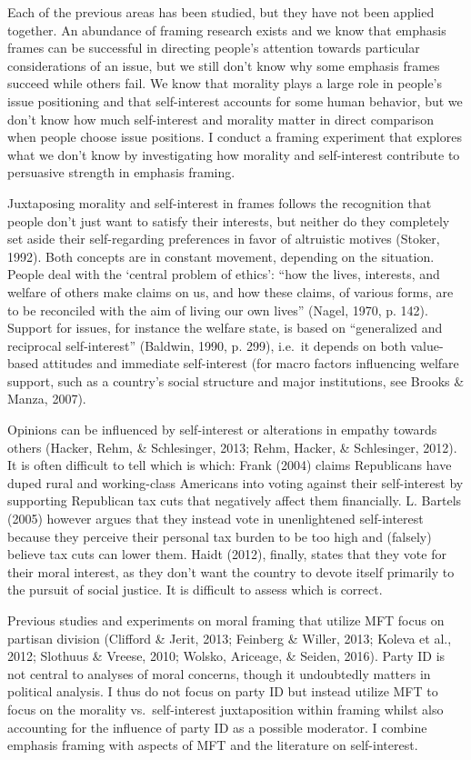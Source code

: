 \documentclass[12pt,econ]{sources/authesis}
\begin{document}
Each of the previous areas has been studied, but they have not been applied together. An abundance of framing research exists and we know that emphasis frames can be successful in directing people's attention towards particular considerations of an issue, but we still don't know why some emphasis frames succeed while others fail. We know that morality plays a large role in people's issue positioning and that self-interest accounts for some human behavior, but we don't know how much self-interest and morality matter in direct comparison when people choose issue positions. I conduct a framing experiment that explores what we don't know by investigating how morality and self-interest contribute to persuasive strength in emphasis framing.

Juxtaposing morality and self-interest in frames follows the recognition that people don't just want to satisfy their interests, but neither do they completely set aside their self-regarding preferences in favor of altruistic motives (Stoker, 1992). Both concepts are in constant movement, depending on the situation. People deal with the `central problem of ethics': ``how the lives, interests, and welfare of others make claims on us, and how these claims, of various forms, are to be reconciled with the aim of living our own lives'' (Nagel, 1970, p. 142). Support for issues, for instance the welfare state, is based on ``generalized and reciprocal self-interest'' (Baldwin, 1990, p. 299), i.e.~it depends on both value-based attitudes and immediate self-interest (for macro factors influencing welfare support, such as a country's social structure and major institutions, see Brooks \& Manza, 2007).

Opinions can be influenced by self-interest or alterations in empathy towards others (Hacker, Rehm, \& Schlesinger, 2013; Rehm, Hacker, \& Schlesinger, 2012). It is often difficult to tell which is which: Frank (2004) claims Republicans have duped rural and working-class Americans into voting against their self-interest by supporting Republican tax cuts that negatively affect them financially. L. Bartels (2005) however argues that they instead vote in unenlightened self-interest because they perceive their personal tax burden to be too high and (falsely) believe tax cuts can lower them. Haidt (2012), finally, states that they vote for their moral interest, as they don't want the country to devote itself primarily to the pursuit of social justice. It is difficult to assess which is correct.

Previous studies and experiments on moral framing that utilize MFT focus on partisan division (Clifford \& Jerit, 2013; Feinberg \& Willer, 2013; Koleva et al., 2012; Slothuus \& Vreese, 2010; Wolsko, Ariceage, \& Seiden, 2016). Party ID is not central to analyses of moral concerns, though it undoubtedly matters in political analysis. I thus do not focus on party ID but instead utilize MFT to focus on the morality vs.~self-interest juxtaposition within framing whilst also accounting for the influence of party ID as a possible moderator. I combine emphasis framing with aspects of MFT and the literature on self-interest.
\end{document}
